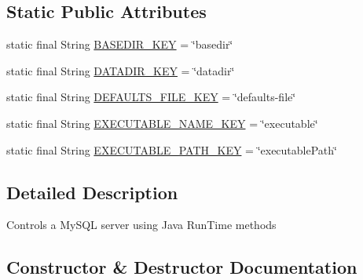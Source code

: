 \subsection*{Static Public Attributes}
\begin{DoxyCompactItemize}
\item 
static final String \mbox{\hyperlink{classcom_1_1mysql_1_1jdbc_1_1util_1_1_server_controller_a51fa2773730e6933b1baa8610bb91017}{B\+A\+S\+E\+D\+I\+R\+\_\+\+K\+EY}} = \char`\"{}basedir\char`\"{}
\item 
static final String \mbox{\hyperlink{classcom_1_1mysql_1_1jdbc_1_1util_1_1_server_controller_a6929b154ac0f3840f1654d6fe14d00a7}{D\+A\+T\+A\+D\+I\+R\+\_\+\+K\+EY}} = \char`\"{}datadir\char`\"{}
\item 
static final String \mbox{\hyperlink{classcom_1_1mysql_1_1jdbc_1_1util_1_1_server_controller_a2e636a2e93651a44ffea831746f62609}{D\+E\+F\+A\+U\+L\+T\+S\+\_\+\+F\+I\+L\+E\+\_\+\+K\+EY}} = \char`\"{}defaults-\/file\char`\"{}
\item 
static final String \mbox{\hyperlink{classcom_1_1mysql_1_1jdbc_1_1util_1_1_server_controller_ac1de6b0980551fc8ee99dfe18fafc702}{E\+X\+E\+C\+U\+T\+A\+B\+L\+E\+\_\+\+N\+A\+M\+E\+\_\+\+K\+EY}} = \char`\"{}executable\char`\"{}
\item 
static final String \mbox{\hyperlink{classcom_1_1mysql_1_1jdbc_1_1util_1_1_server_controller_a7c56575e12f54995614dc3901aedb25a}{E\+X\+E\+C\+U\+T\+A\+B\+L\+E\+\_\+\+P\+A\+T\+H\+\_\+\+K\+EY}} = \char`\"{}executable\+Path\char`\"{}
\end{DoxyCompactItemize}


\subsection{Detailed Description}
Controls a My\+S\+QL server using Java Run\+Time methods 

\subsection{Constructor \& Destructor Documentation}
\mbox{\label{classcom_1_1mysql_1_1jdbc_1_1util_1_1_server_controller_aa9752aa2669c5aa953af66f978cf09a1}} 
